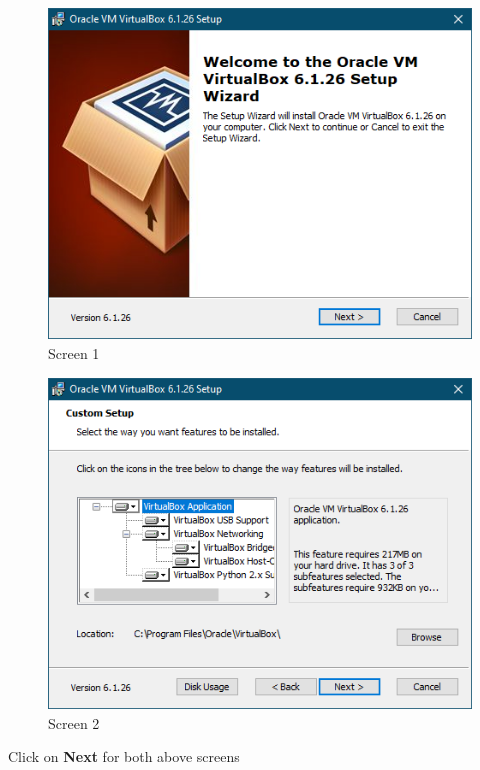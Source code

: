 \documentclass[a4paper, 12pt, titlepage]{report}
\begin{document}
\begin{multicols}{2}
\begin{figure}[H]
    \centering
    \includegraphics[scale=0.5]{pics/vb1.PNG}
    \caption{Screen 1}
\end{figure}
\begin{figure}[H]
    \centering
    \includegraphics[scale=0.5]{pics/vb2.PNG}
    \caption{Screen 2}
\end{figure}
\end{multicols}
Click on \textbf{Next} for both above screens
\end{document}
